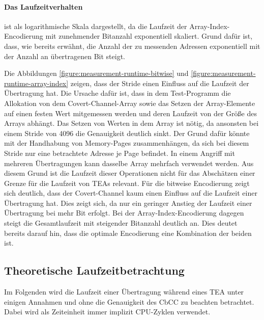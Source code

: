 \paragraph{Das Laufzeitverhalten}
ist als logarithmische Skala dargestellt, da die Laufzeit der
Ar\-ray-Index-Encodierung mit zunehmender Bitanzahl exponentiell
skaliert. Grund dafür ist, dass, wie bereits erwähnt, die Anzahl
der zu messenden Adressen exponentiell mit der Anzahl an
übertragenen Bit steigt.

Die Abbildungen
\ref{figure:measurement-runtime-bitwise} und
\ref{figure:measurement-runtime-array-index} zeigen, dass der Stride
einen Einfluss auf die Laufzeit der Übertragung hat. Die Ursache
dafür ist, dass in dem Test-Programm die Allokation
von dem Covert-Channel-Array sowie das Setzen der Array-Elemente auf einen
festen Wert mitgemessen werden und deren Laufzeit
von der Größe des Arrays abhängt. Das Setzen von Werten
in dem Array ist nötig, da ansonsten bei einem Stride von 4096 die
Genauigkeit deutlich sinkt. Der Grund dafür könnte mit der Handhabung
von Memory-Pages zusammenhängen, da sich bei diesem Stride nur eine
betrachtete Adresse je Page befindet. In einem Angriff
mit mehreren Übertragungen kann dasselbe Array mehrfach verwendet
werden. Aus diesem Grund ist die Laufzeit dieser Operationen nicht für
das Abschätzen einer Grenze für die Laufzeit von \acp{TEA} relevant.
Für die bitweise Encodierung zeigt sich deutlich, dass der
Covert-Channel kaum einen Einfluss auf die Laufzeit einer Übertragung
hat. Dies zeigt sich, da nur ein geringer Anstieg der Laufzeit einer
Übertragung bei mehr Bit erfolgt. Bei der Array-Index-Encodierung
dagegen steigt die Gesamtlaufzeit mit steigender Bitanzahl deutlich
an. Dies deutet bereits darauf hin, dass die optimale Encodierung
eine Kombination der beiden ist.

\subsection{Theoretische Laufzeitbetrachtung}
Im Folgenden wird die Laufzeit einer Übertragung während eines
\ac{TEA} unter einigen Annahmen und ohne die Genauigkeit des
\ac{CbCC} zu beachten betrachtet. Dabei wird als Zeiteinheit
immer implizit \ac{CPU}-Zyklen verwendet.

